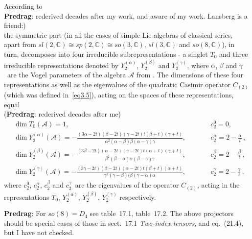 \begin{description}
According to 
\\{\bf Predrag}: rederived decades after
my work, and aware of my work. Lansberg is a friend:)
\\
the symmetric
part (in all the cases of simple Lie algebras of classical series, apart
from $sl(2,\mathbb{C})\cong sp(2,\mathbb{C})\cong so(3,\mathbb{C})$,
$sl(3,\mathbb{C})$ and $so(8,\mathbb{C})$), in turn, decomposes into four
irreducible subrepresentations - a singlet $T_0$ and three irreducible
representations denoted by $Y_2^{(\alpha)}$, $Y_2^{(\beta)}$ and
$Y_2^{(\gamma)}$, where $\alpha$, $\beta$ and $\gamma$~are the Vogel
parameters of the algebra $\mathcal{A}$ from . The
dimensions of these four representations as well as the eigenvalues of
the quadratic Casimir operator $C_{(2)}$ (which was defined
in~\eqref{eq3.5}), acting on the spaces of these representations, equal
\cite{PV99,lands01}
\\({\bf Predrag}: rederived decades after me)
\begin{equation}
\label{eq5.1}
\begin{alignedat}{2}
&\dim T_0(\mathcal{A})=1, &\qquad &c_2^0=0,\\
&\dim Y_2^{(\alpha)}(\mathcal{A})=-\frac{(3\alpha-2t)(\beta-2t)(\gamma-2t)t(\beta+t)(\gamma+t)}{\alpha^2(\alpha-\beta)\beta(\alpha-\gamma)\gamma}, &\qquad &c_2^\alpha=2-\frac{\alpha}{t}\,,\\
&\dim Y_2^{(\beta)}(\mathcal{A})=-\frac{(3\beta-2t)(\alpha-2t)(\gamma-2t)t(\alpha+t)(\gamma+t)}{\beta^2(\beta-\alpha)\alpha(\beta-\gamma)\gamma}, &\qquad &c_2^\beta=2-\frac{\beta}{t}\,,\\
&\dim Y_2^{(\gamma)}(\mathcal{A})=-\frac{(3\gamma-2t)(\beta-2t)(\alpha-2t)t(\beta+t)(\alpha+t)}{\gamma^2(\gamma-\beta)(\beta(\gamma-\alpha)\alpha}, &\qquad &c_2^\gamma=2-\frac{\gamma}{t}\,,
\end{alignedat}
\end{equation}
where $c_2^0$, $c_2^\alpha$, $c_2^\beta$ and $c_2^\gamma$~are the
eigenvalues of the operator $C_{(2)}$, acting in the representations
$T_0$, $Y_2^{(\alpha)}$, $Y_2^{(\beta)}$, $Y_2^{(\gamma)}$ respectively.

{\bf Predrag}: For $so(8)=D_4$ see
 {table~17.1},
 {table~17.2}.
The above projectors should be special cases of
those in 
{sect.~17.1} {\em Two-index tensors},
and  {eq.~(21.4)},
but I have not checked.


\end{description}
